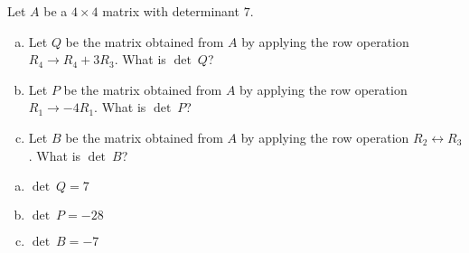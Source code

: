 
\begin{exerciseStatement}


Let \(A\) be a \(4 \times 4\) matrix with determinant \( 7 \).


\begin{enumerate}[(a)]
\item Let \(Q\) be the matrix obtained from \(A\) by applying the row operation \( R_4 \to R_4 + 3R_3 \). What is \(\operatorname{det}\ Q\)?
\item Let \(P\) be the matrix obtained from \(A\) by applying the row operation \( R_1 \to -4R_1 \). What is \(\operatorname{det}\ P\)?
\item Let \(B\) be the matrix obtained from \(A\) by applying the row operation \( R_2 \leftrightarrow R_3 \). What is \(\operatorname{det}\ B\)?
\end{enumerate}
    
\end{exerciseStatement}
    
\begin{exerciseAnswer} 

\begin{enumerate}[(a)]
\item \(\operatorname{det}\ Q= 7 \)
\item \(\operatorname{det}\ P= -28 \)
\item \(\operatorname{det}\ B= -7 \)
\end{enumerate}
    
\end{exerciseAnswer}
    
